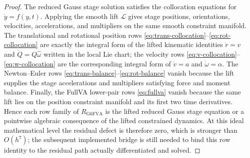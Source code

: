 \documentclass[preprint,12pt]{elsarticle}
\begin{document}
\begin{proof}
The reduced Gauss stage solution satisfies the collocation equations for
$\dot y=f(y,t)$. Applying the smooth lift $\mathcal L$ gives stage positions,
orientations, velocities, accelerations, and multipliers on the same smooth
constraint manifold. The translational and rotational position rows
\eqref{eq:trans-collocation}--\eqref{eq:rot-collocation} are exactly the
integral form of the lifted kinematic identities
$\dot r=v$ and $\dot Q=Q\widehat\omega$ written in the local Lie chart; the
velocity rows \eqref{eq:v-collocation}--\eqref{eq:w-collocation} are the
corresponding integral form of $\dot v=a$ and $\dot\omega=\alpha$. The
Newton--Euler rows \eqref{eq:trans-balance}--\eqref{eq:rot-balance} vanish
because the lift supplies the stage accelerations and multipliers satisfying
force and moment balance. Finally, the FullVA lower-pair rows
\eqref{eq:fullva} vanish because the same lift lies on the position
constraint manifold and its first two time derivatives. Hence each row
family of $R_{\mathrm{G6FVA}}$ is the lifted reduced Gauss stage equation or
a pointwise algebraic consequence of the lifted constrained dynamics. At this
ideal mathematical level the residual defect is therefore zero, which is
stronger than \(O(h^7)\); the subsequent implemented bridge is still needed
to bind this row identity to the residual path actually differentiated and
solved.
\end{proof}
\end{document}
